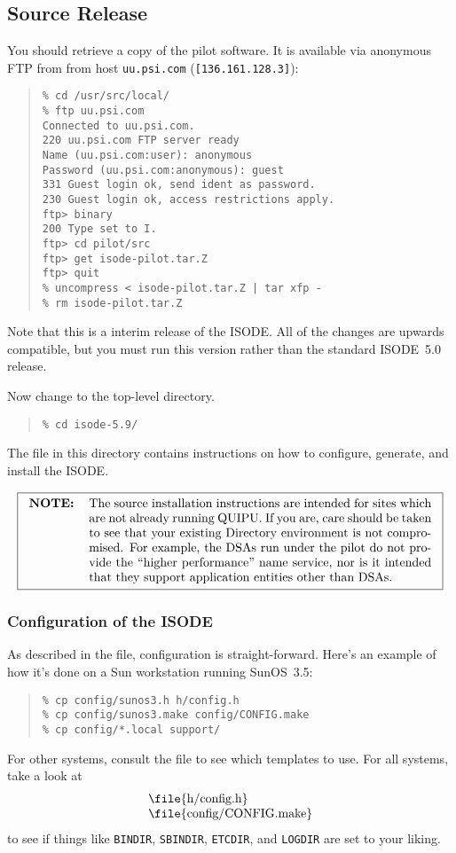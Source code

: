 \subsection	{Source Release}
You should retrieve a copy of the pilot software.
It is available via anonymous FTP from from host
\verb"uu.psi.com" (\verb"[136.161.128.3]"):
\begin{quote}\small\begin{verbatim}
% cd /usr/src/local/
% ftp uu.psi.com
Connected to uu.psi.com.
220 uu.psi.com FTP server ready
Name (uu.psi.com:user): anonymous
Password (uu.psi.com:anonymous): guest
331 Guest login ok, send ident as password.
230 Guest login ok, access restrictions apply.
ftp> binary
200 Type set to I.
ftp> cd pilot/src
ftp> get isode-pilot.tar.Z
ftp> quit
% uncompress < isode-pilot.tar.Z | tar xfp -
% rm isode-pilot.tar.Z
\end{verbatim}\end{quote}
Note that this is a interim release of the ISODE.
All of the changes are upwards compatible,
but you must run this version rather than the standard ISODE~5.0 release.

Now change to the top-level directory.
\begin{quote}\small\begin{verbatim}
% cd isode-5.9/
\end{verbatim}\end{quote}
The file  in this directory contains instructions on how to
configure, generate, and install the ISODE.

\[\fbox{\begin{tabular}{lp{0.8\textwidth}}
\bf NOTE:&	The source installation instructions are intended for
		sites which are not already running QUIPU.
		If you are,
		care should be taken to see that your existing Directory
		environment is not compromised.
		For example,
		the DSAs run under the pilot do not provide the
		``higher performance'' name service,
		nor is it intended that they support application entities
		other than DSAs.
\end{tabular}}\]

\subsubsection	{Configuration of the ISODE}
As described in the  file,
configuration is straight-forward.
Here's an example of how it's done on a Sun workstation running SunOS~3.5:
\begin{quote}\small\begin{verbatim}
% cp config/sunos3.h h/config.h
% cp config/sunos3.make config/CONFIG.make
% cp config/*.local support/
\end{verbatim}\end{quote}
For other systems,
consult the  file to see which templates to use.
For all systems,
take a look at
\[\begin{tabular}{l}
\file{h/config.h}\\
\file{config/CONFIG.make}\\
\end{tabular}\]
to see if things like \verb"BINDIR",
\verb"SBINDIR", \verb"ETCDIR", and \verb"LOGDIR" are set to your liking.

